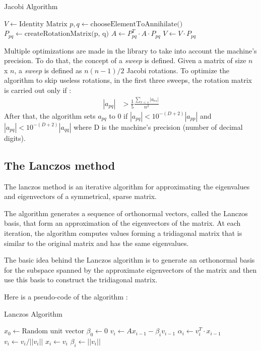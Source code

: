 \documentclass{book}
\begin{document}
\begin{algorithm}
  \caption{Jacobi Algorithm}
  \begin{algorithmic}[1]
    \State $V \gets \text{Identity Matrix}$
        \State $p, q \gets \text{chooseElementToAnnihilate()}$ 
        \State $P_{pq} \gets \text{createRotationMatrix(p, q)}$
        \State $A \gets P_{pq}^{T} \cdot A \cdot P_{pq}$
        \State $V \gets V \cdot P_{pq}$
    \EndFor
  \end{algorithmic}
\end{algorithm}

Multiple optimizations are made in the library to take into account the machine's precision. To do that, the concept of a \textit{sweep} is defined. Given a matrix of size $n$ x $n$, a \textit{sweep} is defined as $n (n - 1) / 2$ Jacobi rotations. To optimize the algorithm to skip useless rotations, in the first three sweeps, the rotation matrix is carried out only if :
\begin{align*}
    |a_{pq}| &> \frac{1}{5}\frac{\sum_{r<s}|a_{rs}|}{n^2}
\end{align*}
After that, the algorithm sets $a_{pq}$ to 0 if $|a_{pq}| < 10^{-(D+2)}|a_{pp}|$ and $|a_{pq}| < 10^{-(D+2)}|a_{qq}|$ where D is the machine's precision (number of decimal digits).

\subsection{The Lanczos method}

The lanczos method is an iterative algorithm for approximating the eigenvalues and eigenvectors of a symmetrical, sparse matrix.

The algorithm generates a sequence of orthonormal vectors, called the Lanczos basis, that form an approximation of the eigenvectors of the matrix. At each iteration, the algorithm computes values forming a tridiagonal matrix that is similar to the original matrix and has the same eigenvalues.

The basic idea behind the Lanczos algorithm is to generate an orthonormal basis for the subspace spanned by the approximate eigenvectors of the matrix and then use this basis to construct the tridiagonal matrix.

Here is a pseudo-code of the algorithm :

\begin{algorithm}
  \caption{Lanczos Algorithm}
  \begin{algorithmic}[1]
    \State $\text{$x_{0}$} \gets \text{Random unit vector}$
    \State $\beta_{0} \gets 0$
   
    \State $\textit{v}_{i} \gets Ax_{i-1} - \beta_{i}\textit{v}_{i-1}$
    \State $\alpha_{i} \gets v_{i}^{T} \cdot x_{i-1}$
    \State $v_{i} \gets v_{i}/||v_{i}||$
    \State $x_{i} \gets v_{i}$
    \State $\beta_{i} \gets ||v_{i}||$
  \EndFor
  \end{algorithmic}
\end{algorithm}
\end{document}
